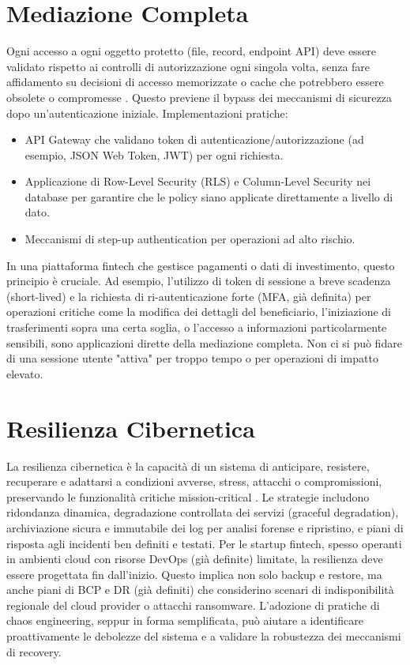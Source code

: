 \section{Mediazione Completa}
Ogni accesso a ogni oggetto protetto (file, record, endpoint API) deve essere validato rispetto ai controlli di autorizzazione ogni singola volta, senza fare affidamento su decisioni di accesso memorizzate o cache che potrebbero essere obsolete o compromesse \cite{Saltzer_Schroeder_1975}. Questo previene il bypass dei meccanismi di sicurezza dopo un'autenticazione iniziale.
Implementazioni pratiche:
\begin{itemize}
\item API Gateway che validano token di autenticazione/autorizzazione (ad esempio, JSON Web Token, JWT) per ogni richiesta.
\item Applicazione di Row-Level Security (RLS) e Column-Level Security nei database per garantire che le policy siano applicate direttamente a livello di dato.
\item Meccanismi di step-up authentication per operazioni ad alto rischio.
\end{itemize}
In una piattaforma fintech che gestisce pagamenti o dati di investimento, questo principio è cruciale. Ad esempio, l'utilizzo di token di sessione a breve scadenza (short-lived) e la richiesta di ri-autenticazione forte (MFA, già definita) per operazioni critiche come la modifica dei dettagli del beneficiario, l'iniziazione di trasferimenti sopra una certa soglia, o l'accesso a informazioni particolarmente sensibili, sono applicazioni dirette della mediazione completa. Non ci si può fidare di una sessione utente "attiva" per troppo tempo o per operazioni di impatto elevato.
\section{Resilienza Cibernetica}
La resilienza cibernetica è la capacità di un sistema di anticipare, resistere, recuperare e adattarsi a condizioni avverse, stress, attacchi o compromissioni, preservando le funzionalità critiche mission-critical \cite{NIST_SP_800_160v2_2019}. Le strategie includono ridondanza dinamica, degradazione controllata dei servizi (graceful degradation), archiviazione sicura e immutabile dei log per analisi forense e ripristino, e piani di risposta agli incidenti ben definiti e testati.
Per le startup fintech, spesso operanti in ambienti cloud con risorse DevOps (già definite) limitate, la resilienza deve essere progettata fin dall'inizio. Questo implica non solo backup e restore, ma anche piani di BCP e DR (già definiti) che considerino scenari di indisponibilità regionale del cloud provider o attacchi ransomware. L'adozione di pratiche di chaos engineering, seppur in forma semplificata, può aiutare a identificare proattivamente le debolezze del sistema e a validare la robustezza dei meccanismi di recovery.
